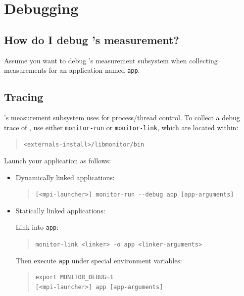 \documentclass[11pt,twoside,letterpaper]{report}
\begin{document}
\section{Debugging}

\subsection{How do I debug \HPCToolkit{}'s measurement?}

Assume you want to debug \HPCToolkit{}'s measurement subsystem when
collecting measurements for an application named \texttt{app}.


\subsection{Tracing \libmonitor{}}

\HPCToolkit{}'s measurement subsystem
uses \libmonitor{} for process/thread control.
To collect a debug trace of \libmonitor{}, use either \texttt{monitor-run} or \texttt{monitor-link}, which are located within:
%
\begin{quote}
  \verb|<externals-install>/libmonitor/bin|
\end{quote}
Launch your application as follows:
%
\begin{itemize}

\item Dynamically linked applications:\hfill
\begin{quote}
  \verb|[<mpi-launcher>] monitor-run --debug app [app-arguments]|
\end{quote}

\item Statically linked applications:\hfill

Link \libmonitor{} into \texttt{app}:
\begin{quote}
  \verb|monitor-link <linker> -o app <linker-arguments>|
\end{quote}
%
Then execute \texttt{app} under special environment variables:
\begin{quote}
\begin{verbatim}
export MONITOR_DEBUG=1
[<mpi-launcher>] app [app-arguments]
\end{verbatim}
\end{quote}
\end{itemize}
\end{document}
